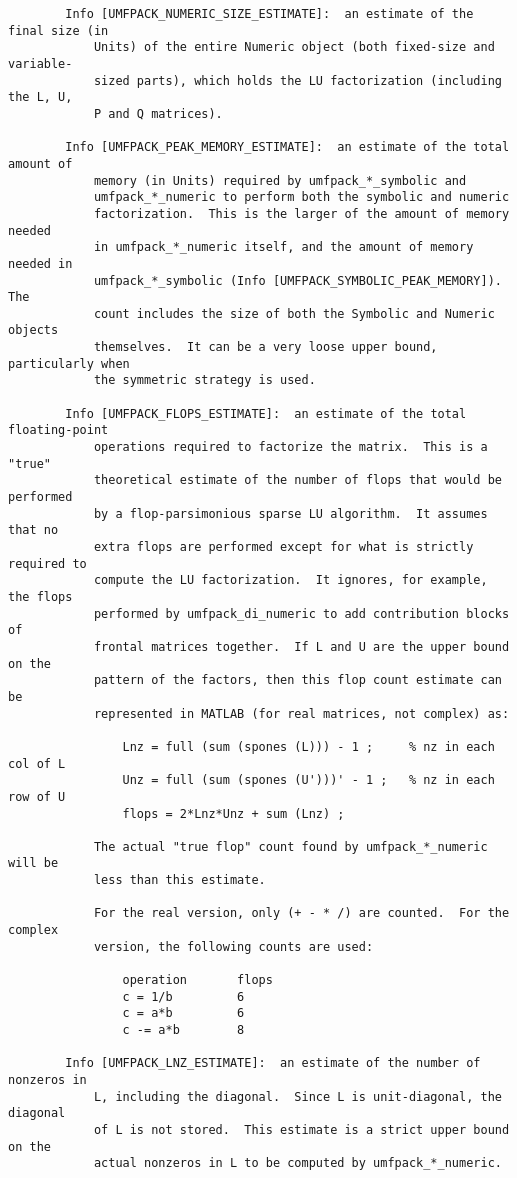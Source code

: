 \documentclass[11pt]{article}
\begin{document}
{\begin{verbatim}
        Info [UMFPACK_NUMERIC_SIZE_ESTIMATE]:  an estimate of the final size (in
            Units) of the entire Numeric object (both fixed-size and variable-
            sized parts), which holds the LU factorization (including the L, U,
            P and Q matrices).

        Info [UMFPACK_PEAK_MEMORY_ESTIMATE]:  an estimate of the total amount of
            memory (in Units) required by umfpack_*_symbolic and
            umfpack_*_numeric to perform both the symbolic and numeric
            factorization.  This is the larger of the amount of memory needed
            in umfpack_*_numeric itself, and the amount of memory needed in
            umfpack_*_symbolic (Info [UMFPACK_SYMBOLIC_PEAK_MEMORY]).  The
            count includes the size of both the Symbolic and Numeric objects
            themselves.  It can be a very loose upper bound, particularly when
            the symmetric strategy is used.

        Info [UMFPACK_FLOPS_ESTIMATE]:  an estimate of the total floating-point
            operations required to factorize the matrix.  This is a "true"
            theoretical estimate of the number of flops that would be performed
            by a flop-parsimonious sparse LU algorithm.  It assumes that no
            extra flops are performed except for what is strictly required to
            compute the LU factorization.  It ignores, for example, the flops
            performed by umfpack_di_numeric to add contribution blocks of
            frontal matrices together.  If L and U are the upper bound on the
            pattern of the factors, then this flop count estimate can be
            represented in MATLAB (for real matrices, not complex) as:

                Lnz = full (sum (spones (L))) - 1 ;     % nz in each col of L
                Unz = full (sum (spones (U')))' - 1 ;   % nz in each row of U
                flops = 2*Lnz*Unz + sum (Lnz) ;

            The actual "true flop" count found by umfpack_*_numeric will be
            less than this estimate.

            For the real version, only (+ - * /) are counted.  For the complex
            version, the following counts are used:

                operation       flops
                c = 1/b         6
                c = a*b         6
                c -= a*b        8

        Info [UMFPACK_LNZ_ESTIMATE]:  an estimate of the number of nonzeros in
            L, including the diagonal.  Since L is unit-diagonal, the diagonal
            of L is not stored.  This estimate is a strict upper bound on the
            actual nonzeros in L to be computed by umfpack_*_numeric.


\end{verbatim}}
\end{document}
